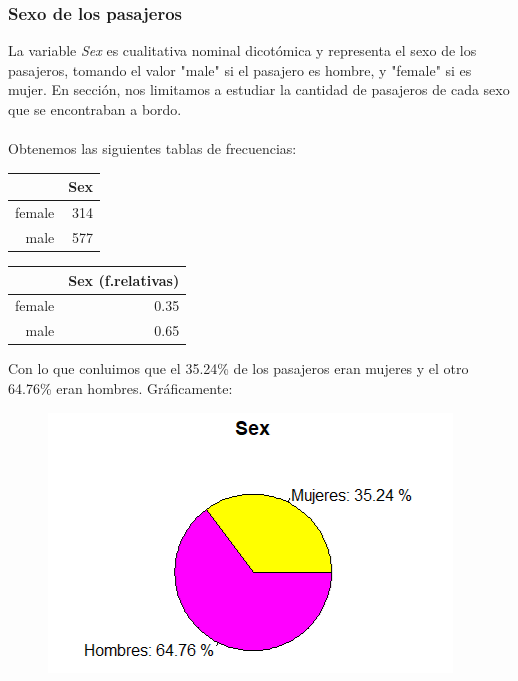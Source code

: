 \documentclass{article}
\begin{document}
\newpage
\subsubsection{Sexo de los pasajeros}
La variable \textit{Sex} es cualitativa nominal dicotómica y representa el sexo de los pasajeros, tomando el valor "male" si el pasajero es hombre, y "female" si es mujer. En sección, nos limitamos a estudiar la cantidad de pasajeros de cada sexo que se encontraban a bordo.\\\\
Obtenemos las siguientes tablas de frecuencias:

\begin{table}[htbp]
    \centering
    \begin{minipage}{.5\textwidth}
        \centering
        \begin{tabular}{rr}
          \hline
         & Sex \\ 
          \hline
        female & 314 \\ 
          male & 577 \\ 
           \hline
        \end{tabular}
    \end{minipage}%
    \begin{minipage}{.5\textwidth}
        \centering
        \begin{tabular}{rr}
          \hline
         & Sex (f.relativas) \\ 
          \hline
        female & 0.35 \\ 
          male & 0.65 \\ 
           \hline
        \end{tabular}
    \end{minipage}
\end{table}

\noindent Con lo que conluimos que el 35.24\% de los pasajeros eran mujeres y el otro 64.76\% eran hombres. Gráficamente:

\begin{figure}[!h]
    \centering
    \includegraphics[width=0.5\linewidth]{content/pie_sex.png}
\end{figure}
\end{document}
